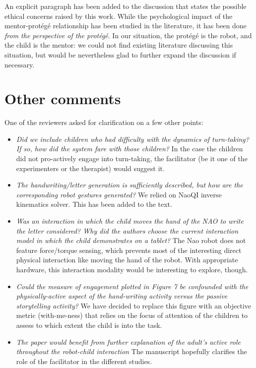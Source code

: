 \documentclass{article}
\begin{document}
An explicit paragraph has been added to the discussion that states the possible
ethical concerns raised by this work. While the psychological impact of the
mentor-protégé relationship has been studied in the literature, it has been
done \emph{from the perspective of the protégé}. In our situation, the protégé
is the robot, and the child is the mentor: we could not find existing
literature discussing this situation, but would be nevertheless glad to further
expand the discussion if necessary.

\section*{Other comments}

One of the reviewers asked for clarification on a few other points:

\begin{itemize}

\item \emph{Did we include children who had difficulty with the dynamics of
turn-taking? If so, how did the system fare with those children?} In the case
the children did not pro-actively engage into turn-taking, the facilitator (be
it one of the experimenters or the therapist) would suggest it.

\item \emph{The handwriting/letter generation is sufficiently described, but
how are the corresponding robot gestures generated?} We relied on NaoQI inverse
kinematics solver. This has been added to the text.

\item \emph{Was an interaction in which the child moves the hand of the NAO to
write the letter considered? Why did the authors choose the current interaction
model in which the child demonstrates on a tablet?} The Nao robot does not
feature force/torque sensing, which prevents most of the interesting direct
physical interaction like moving the hand of the robot. With appropriate
hardware, this interaction modality would be interesting to explore, though.

\item \emph{Could the measure of engagement plotted in Figure 7 be confounded
with the physically-active aspect of the hand-writing activity versus the
passive storytelling activity?} We have decided to replace this figure with an
objective metric (with-me-ness) that relies on the focus of attention of the
children to assess to which extent the child is into the task.

\item \emph{The paper would benefit from further explanation of the adult's
active role throughout the robot-child interaction} The manuscript hopefully
clarifies the role of the facilitator in the different studies.

\end{itemize}
\end{document}

